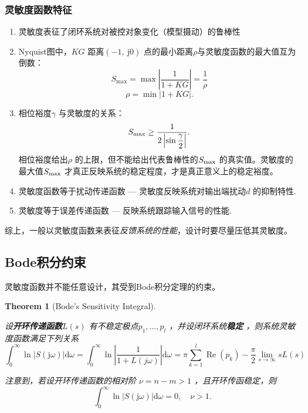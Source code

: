 \documentclass[14pt,a4paper]{article}
\theoremstyle{plain}
\newtheorem{thm}{Theorem}[section]
\theoremstyle{definition}
\theoremstyle{remark}
\theoremstyle{plain}
\theoremstyle{plain}
\theoremstyle{definition}
\begin{document}
			\subsubsection{灵敏度函数特征}%
			\label{ssub:灵敏度函数特征}
			
				\begin{enumerate}
					\item 灵敏度表征了闭环系统对被控对象变化（模型摄动）的鲁棒性
					\item Nyquist图中，$KG$ 距离$\left( -1,\ \mathrm{j} 0 \right)$ 点的最小距离$\rho$与灵敏度函数的最大值互为倒数：
						\[
						S_{\text{max}} = \mathop{\text{max}} \left| \dfrac{1}{1+KG} \right| = \dfrac{1}{\rho}
						\]
						\[
						\rho = \mathop{\text{min}} \left| 1+KG \right| 
						.\]
					\item 相位裕度$\gamma $ 与灵敏度的关系：
						\[
						S_\textnormal{max} \ge \dfrac{1}{2\left| \sin \dfrac{\gamma}{2} \right| }
						.\]
						相位裕度给出$\rho$ 的上限，但不能给出代表鲁棒性的$S_\textnormal{max}$ 的真实值。灵敏度的最大值$S_\textnormal{max}$ 才真正反映系统的稳定程度，才是真正意义上的稳定裕度。
					\item 灵敏度函数等于扰动传递函数 --- 灵敏度反映系统对输出端扰动$d$ 的抑制特性. 
					\item 灵敏度等于误差传递函数 --- 反映系统跟踪输入信号的性能. 
				\end{enumerate} 

				综上，一般以灵敏度函数来表征\emph{反馈系统的性能}，设计时要尽量压低其灵敏度。 

		\subsection{Bode积分约束}%
		\label{sub:bode积分约束}

			灵敏度函数并不能任意设计，其受到Bode积分定理的约束。

			\begin{thm}[Bode's Sensitivity Integral]  
			\label{the:bode_s_sensitivity_integral} 

			设\textbf{开环传递函数}$L(s)$ 有不稳定极点$p_1,\ldots ,p_{l}$ ，并设闭环系统\textbf{稳定} ，则系统灵敏度函数满足下列关系
				\[
					\int_{0}^{\infty} \ln |S(\mathrm{j} \omega)| \mathrm d \omega=\int_{0}^{\infty} \ln \left|\frac{1}{1+L(j \omega)}\right| \mathrm d \omega=\pi \sum_{k=1}^l \operatorname{Re}\left(p_{k}\right)-\frac{\pi}{2} \lim _{s \rightarrow \infty} s L(s)
				\]

				注意到，若设开环传递函数的相对阶 $\nu = n-m>1$ ，且开环传函稳定，则
				\[
					\int_{0}^\infty \ln \left| S(\mathrm{j} \omega ) \right| \mathrm d \omega = 0,\quad \nu>1
				.\] 
			\end{thm} 
		
\end{document}
